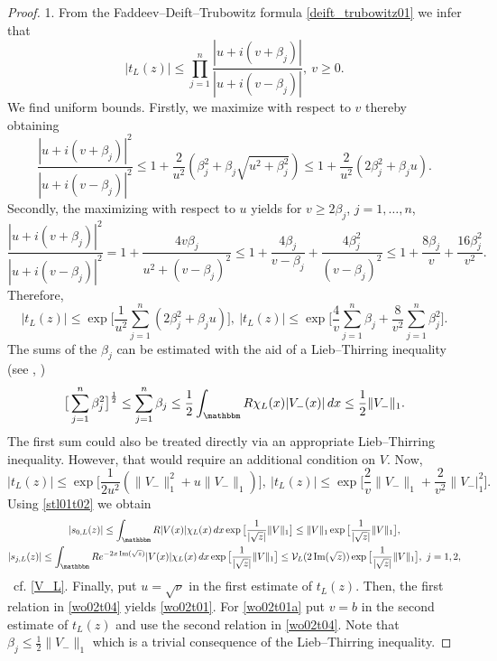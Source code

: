 \begin{proof}
1.
From the Faddeev--Deift--Trubowitz formula \eqref{deift_trubowitz01} we infer that
\begin{equation}\label{deift_trubowitz02}
  |t_L(z)| \leq \prod_{j=1}^n \frac{|u+i(v+\beta_j)|}{|u+i(v-\beta_j)|},\ v\geq 0 .
\end{equation}
We find uniform bounds. Firstly, we maximize with respect to $v$ thereby obtaining
\begin{equation*}
  \frac{|u+i(v+\beta_j)|^2}{|u+i(v-\beta_j)|^2}
    \leq 1 + \frac{2}{u^2} ( \beta_j^2 + \beta_j\sqrt{u^2+\beta_j^2} ) 
    \leq 1 + \frac{2}{u^2} ( 2 \beta_j^2 + \beta_j u ).
\end{equation*}
Secondly, the maximizing with respect to $u$ yields for $v\geq 2\beta_j$, $j=1,\ldots,n$,
\begin{equation*}
  \frac{|u+i(v+\beta_j)|^2}{|u+i(v-\beta_j)|^2}
     = 1 + \frac{4v\beta_j}{u^2+(v-\beta_j)^2}
     \leq 1 + \frac{4\beta_j}{v-\beta_j} + \frac{4\beta_j^2}{(v-\beta_j)^2}
     \leq 1 + \frac{8\beta_j}{v} + \frac{16\beta_j^2}{v^2} .
\end{equation*}
Therefore,
\begin{equation*}
  |t_L(z)| \leq \exp\Big[ \frac{1}{u^2} \sum_{j=1}^n ( 2 \beta_j^2 + \beta_j u ) \Big] ,\
  |t_L(z)| \leq \exp\Big[ \frac{4}{v}\sum_{j=1}^n \beta_j + \frac{8}{v^2}\sum_{j=1}^n \beta_j^2 \Big] .
\end{equation*}
The sums of the $\beta_j$ can be estimated with the aid of a Lieb--Thirring inequality 
(see \cite{Weidl1996}, \cite{HundertmarkLiebThomas1998})
\begin{equation*}
  \big[\sum_{j=1}^n \beta_j^2\big]^{\frac{1}{2}} 
    \leq \sum_{j=1}^n \beta_j 
    \leq \frac{1}{2} \int_\R \chi_L(x) |V_-(x)| \, dx \leq \frac{1}{2} \| V_- \|_1 .
\end{equation*}
The first sum could also be treated directly via an appropriate Lieb--Thirring inequality. However, that
would require an additional condition on $V$. Now,
\begin{equation*}
  |t_L(z)| \leq \exp\big[ \frac{1}{2u^2} ( \| V_-\|_1^2 + u \| V_-\|_1 )\big] ,\
  |t_L(z)| \leq \exp\big[ \frac{2}{v}\|V_-\|_1 + \frac{2}{v^2}\|V_-|_1^2\big] .
\end{equation*}
Using \eqref{stl01t02} we obtain
\begin{gather*}
  |s_{0,L}(z)| \leq \int_\R  |V(x)|\chi_L(x)\, dx \exp\big[ \frac{1}{|\sqrt{z}|}\|V\|_1 \big]
              \leq \|V\|_1 \exp\big[ \frac{1}{|\sqrt{z}|}\|V\|_1 \big], \\
  |s_{j,L}(z)|
    \leq \int_\R e^{-2x\im(\sqrt{z})} |V(x)|\chi_L(x)\, dx \exp\big[ \frac{1}{|\sqrt{z}|}\|V\|_1 \big]
    \leq \mathcal{V}_L(2\im(\sqrt{z})) \exp\big[ \frac{1}{|\sqrt{z}|}\|V\|_1 \big] ,\ j=1,2,
\end{gather*}\
cf. \eqref{V_L}. Finally, put $u=\sqrt{\nu}$ in the first estimate of $t_L(z)$. Then, the first relation in \eqref{wo02t04} 
yields \eqref{wo02t01}. For \eqref{wo02t01a} put $v=b$ in the second estimate of $t_L(z)$ 
and use the second relation in \eqref{wo02t04}.
Note that $\beta_j\leq\frac{1}{2}\|V_-\|_1$ which is a trivial consequence of the Lieb--Thirring inequality.


\end{proof}

